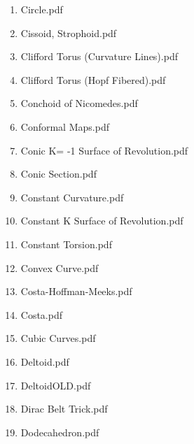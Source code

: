 \documentclass[11pt]{article}
\begin{document}
\begin{enumerate}
\begin{enumerate}
\item Circle.pdf
\label{sec-1-1-1-1-29-20-16}

\item Cissoid, Strophoid.pdf
\label{sec-1-1-1-1-29-20-17}

\item Clifford Torus (Curvature Lines).pdf
\label{sec-1-1-1-1-29-20-18}

\item Clifford Torus (Hopf Fibered).pdf
\label{sec-1-1-1-1-29-20-19}

\item Conchoid of Nicomedes.pdf
\label{sec-1-1-1-1-29-20-20}

\item Conformal Maps.pdf
\label{sec-1-1-1-1-29-20-21}

\item Conic K= -1 Surface of Revolution.pdf
\label{sec-1-1-1-1-29-20-22}

\item Conic Section.pdf
\label{sec-1-1-1-1-29-20-23}

\item Constant Curvature.pdf
\label{sec-1-1-1-1-29-20-24}

\item Constant K Surface of Revolution.pdf
\label{sec-1-1-1-1-29-20-25}

\item Constant Torsion.pdf
\label{sec-1-1-1-1-29-20-26}

\item Convex Curve.pdf
\label{sec-1-1-1-1-29-20-27}

\item Costa-Hoffman-Meeks.pdf
\label{sec-1-1-1-1-29-20-28}

\item Costa.pdf
\label{sec-1-1-1-1-29-20-29}

\item Cubic Curves.pdf
\label{sec-1-1-1-1-29-20-30}

\item Deltoid.pdf
\label{sec-1-1-1-1-29-20-31}

\item DeltoidOLD.pdf
\label{sec-1-1-1-1-29-20-32}

\item Dirac Belt Trick.pdf
\label{sec-1-1-1-1-29-20-33}

\item Dodecahedron.pdf
\label{sec-1-1-1-1-29-20-34}


\end{enumerate}
\end{enumerate}
\end{document}
